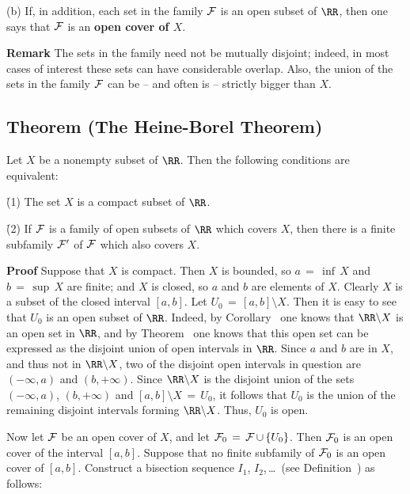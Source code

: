 \V

        (b) If, in addition, each set in the family ${\cal F}$ is an open subset of ${\RR}$,
    then one says that ${\cal F}$ is an {\bf open cover of $X$}.

\V

        {\bf Remark} The sets in the family need not be mutually disjoint; indeed, in most cases of interest these sets can have considerable overlap.
    Also, the union of the sets in the family ${\cal F}$ can be -- and often is -- strictly bigger than $X$.


\V

             \subsection{\small{\bf Theorem} (The Heine-Borel Theorem)}
            \label{ThmF30.40}

\V

        Let $X$ be a nonempty subset of ${\RR}$. Then the following conditions are equivalent:

\V
        \h (1) The set $X$ is a compact subset of ${\RR}$.

        \h (2) If ${\cal F}$ is a family of open subsets of ${\RR}$ which covers $X$,
    then there is a finite subfamily ${\cal F}'$ of ${\cal F}$ which also covers $X$.

\V

        {\bf Proof} Suppose that $X$ is compact. Then $X$ is bounded, so $a \,=\, {\inf}\,X$ and $b \,=\, {\sup}\,X$ are finite;
    and $X$ is closed, so $a$ and $b$ are elements of $X$. Clearly $X$ is a subset of the closed interval $[a,b]$.
    Let $U_{0} \,=\, [a,b]{\setminus}X$. Then it is easy to see that $U_{0}$ is an open subset of ${\RR}$.
    Indeed, by Corollary~ one knows that ${\RR}{\setminus}X$ is an open set in ${\RR}$,
    and by Theorem~ one knows that this open set can be expressed as the disjoint union of open intervals in ${\RR}$.
    Since $a$ and $b$ are in $X$, and thus not in ${\RR}{\setminus}X$, two of the disjoint open intervals in question are $(-{\infty},a)$ and $(b,+{\infty})$.
    Since ${\RR}{\setminus}X$ is the disjoint union of the sets $(-{\infty},a)$, $(b,+{\infty})$ and $[a,b]{\setminus}X \,=\, U_{0}$,
    it follows that $U_{0}$ is the union of the remaining disjoint intervals forming ${\RR}{\setminus}X$. Thus, $U_{0}$ is open.

    Now let ${\cal F}$ be an open cover of $X$, and let ${\cal F}_{0} \,=\, {\cal F}\,{\cup}\,\{U_{0}\}$.
    Then ${\cal F}_{0}$ is an open cover of the interval $[a,b]$.
    Suppose that no finite subfamily of ${\cal F}_{0}$ is an open cover of $[a,b]$.
    Construct a bisection sequence $I_{1}$, $I_{2}$,\,{\ldots}\, (see Definition~) as follows:

